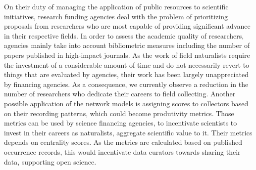 On their duty of managing the application of public resources to scientific initiatives, research funding agencies deal with the problem of prioritizing proposals from researchers who are most capable of providing significant advance in their respective fields.
In order to assess the academic quality of researchers, agencies mainly take into account bibliometric measures including the number of papers published in high-impact journals. 
%
As the work of field naturalists require the investment of a considerable amount of time and do not necessarily revert to things that are evaluated by agencies, their work has been largely unappreciated by financing agencies.
As a consequence, we currently observe a reduction in the number of researchers who dedicate their careers to field collecting.
%
Another possible application of the network models is assigning scores to collectors based on their recording patterns, which could become produtivity metrics.
Those metrics can be used by science financing agencies, to incentivate scientists to invest in their careers as naturalists, aggregate scientific value to it.
Their metrics depends on centrality scores.
As the metrics are calculated based on published occurrence records, this would incentivate data curators towards sharing their data, supporting open science.


